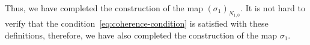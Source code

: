 Thus, we have completed the construction of the map $(\sigma_1)_{N_{1,0}}$.
It is not hard to verify that the condition~\eqref{eq:coherence-condition} is satisfied with these definitions,
therefore, we have also completed the construction of the map $\sigma_1$.



